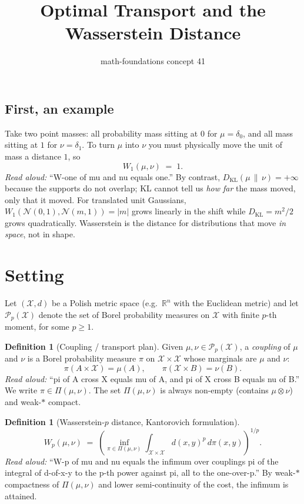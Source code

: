 \documentclass[11pt]{article}
\title{Optimal Transport and the Wasserstein Distance}
\author{math-foundations \textbullet{} concept 41}
\date{}
\theoremstyle{definition}
\newtheorem{definition}[theorem]{Definition}
\theoremstyle{remark}
\begin{document}
\maketitle

\subsection*{First, an example}

Take two point masses: all probability mass sitting at $0$ for $\mu = \delta_0$, and
all mass sitting at $1$ for $\nu = \delta_1$.  To turn $\mu$ into $\nu$ you must
physically move the unit of mass a distance $1$, so
\[
W_1(\mu, \nu) \;=\; 1.
\]
\emph{Read aloud:} ``W-one of mu and nu equals one.''
By contrast, $D_{\mathrm{KL}}(\mu \,\|\, \nu) = +\infty$ because the supports do not
overlap; KL cannot tell us \emph{how far} the mass moved, only that it moved.
For translated unit Gaussians, $W_1(\mathcal{N}(0,1), \mathcal{N}(m,1)) = |m|$ grows
linearly in the shift while $D_{\mathrm{KL}} = m^2/2$ grows quadratically.
Wasserstein is the distance for distributions that move \emph{in space}, not in
shape.

\section*{Setting}

Let $(\mathcal{X}, d)$ be a Polish metric space (e.g.\ $\mathbb{R}^n$ with the Euclidean
metric) and let $\mathcal{P}_p(\mathcal{X})$ denote the set of Borel probability
measures on $\mathcal{X}$ with finite $p$-th moment, for some $p \geq 1$.

\begin{definition}[Coupling / transport plan]
Given $\mu, \nu \in \mathcal{P}_p(\mathcal{X})$, a \emph{coupling} of $\mu$ and $\nu$
is a Borel probability measure $\pi$ on $\mathcal{X} \times \mathcal{X}$ whose marginals
are $\mu$ and $\nu$:
\[
\pi(A \times \mathcal{X}) = \mu(A), \qquad \pi(\mathcal{X} \times B) = \nu(B).
\]
\emph{Read aloud:} ``pi of A cross X equals mu of A, and pi of X cross B equals nu of B.''
We write $\pi \in \Pi(\mu, \nu)$.  The set $\Pi(\mu, \nu)$ is always non-empty
(contains $\mu \otimes \nu$) and weak-$*$ compact.
\end{definition}

\begin{definition}[Wasserstein-$p$ distance, Kantorovich formulation]
\[
W_p(\mu, \nu) \;=\; \left( \inf_{\pi \in \Pi(\mu, \nu)}
   \int_{\mathcal{X} \times \mathcal{X}} d(x,y)^p \, d\pi(x,y) \right)^{1/p}.
\]
\emph{Read aloud:} ``W-p of mu and nu equals the infimum over couplings pi of the integral of d-of-x-y to the p-th power against pi, all to the one-over-p.''
By weak-$*$ compactness of $\Pi(\mu, \nu)$ and lower semi-continuity of the cost,
the infimum is attained.
\end{definition}
\end{document}
